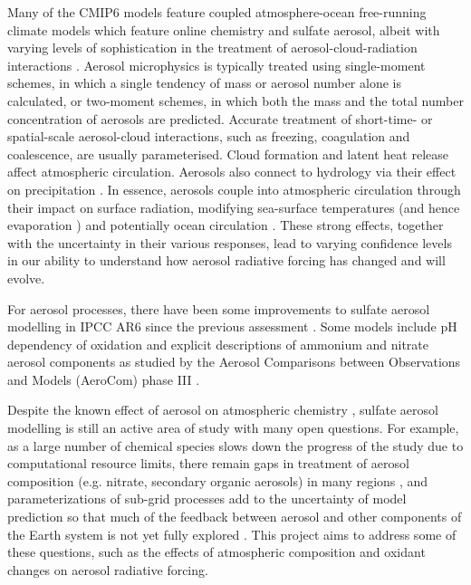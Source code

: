 Many of the CMIP6 models feature coupled atmosphere-ocean free-running climate models which feature online chemistry and sulfate aerosol, albeit with varying levels of sophistication in the treatment of aerosol-cloud-radiation interactions \citep[e.g.][]{zhangBCCESM1ModelDatasets2021, vannoijeECEarth3AerChemGlobalClimate2021, mulcahyDescriptionEvaluationAerosol2020}.  Aerosol microphysics is typically treated using single-moment schemes, in which a single tendency of mass or aerosol number alone is calculated, or two-moment schemes, in which both the mass and the total number concentration of aerosols are predicted.  Accurate treatment of short-time- or spatial-scale aerosol-cloud interactions, such as freezing, coagulation and coalescence, are usually parameterised. Cloud formation and latent heat release affect atmospheric circulation.  Aerosols also connect to hydrology via their effect on precipitation \citep{allenInterhemisphericAerosolRadiative2015}. In essence, aerosols couple into atmospheric circulation through their impact on surface radiation, modifying sea-surface temperatures (and hence evaporation \citep{boothAerosolsImplicatedPrime2012}) and potentially ocean circulation \citep{cowanResponseLargescaleOcean2013}. These strong effects, together with the uncertainty in their various responses, lead to varying confidence levels in our ability to understand how aerosol radiative forcing has changed and will evolve.


For aerosol processes, there have been some improvements to sulfate aerosol modelling in IPCC AR6 since the previous assessment \citep{forsterEarthEnergyBudget2021}. Some models include pH dependency of  oxidation \citep[such as the NorESM1;][]{kirkevagProductiontaggedAerosolModule2018} and explicit descriptions of ammonium and nitrate aerosol components as studied by the Aerosol Comparisons between Observations and Models (AeroCom) phase III \citep{bianInvestigationGlobalParticulate2017}.


Despite the known effect of aerosol on atmospheric chemistry \citep[e.g.][]{oconnorApportionmentPreIndustrial2022}, sulfate aerosol modelling is still an active area of study with many open questions. For example, as a large number of chemical species slows down the progress of the study due to computational resource limits, there remain gaps in treatment of aerosol composition (e.g. nitrate, secondary organic aerosols) in many regions \citep[e.g.][]{mulcahyDescriptionEvaluationAerosol2020}, and parameterizations of sub-grid processes add to the uncertainty of model prediction so that much of the feedback between aerosol and other components of the Earth system is not yet fully explored \citep{seikiImprovementGlobalCloudSystemResolving2015}. This project aims to address some of these questions, such as the effects of atmospheric composition and oxidant changes on aerosol radiative forcing.



